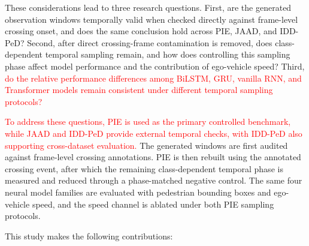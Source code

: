 \documentclass[mti,article,submit,moreauthors]{Definitions/mdpi}
\begin{document}
These considerations lead to three research questions. First, are the generated observation windows temporally valid when checked directly against frame-level crossing onset, and does the same conclusion hold across PIE, JAAD, and IDD-PeD? Second, after direct crossing-frame contamination is removed, does class-dependent temporal sampling remain, and how does controlling this sampling phase affect model performance and the contribution of ego-vehicle speed? Third, \textcolor{red}{do the relative performance differences among BiLSTM, GRU, vanilla RNN, and Transformer models remain consistent under different temporal sampling protocols?}

\textcolor{red}{To address these questions, PIE is used as the primary controlled benchmark, while JAAD and IDD-PeD provide external temporal checks, with IDD-PeD also supporting cross-dataset evaluation.} The generated windows are first audited against frame-level crossing annotations. PIE is then rebuilt using the annotated crossing event, after which the remaining class-dependent temporal phase is measured and reduced through a phase-matched negative control. The same four neural model families are evaluated with pedestrian bounding boxes and ego-vehicle speed, and the speed channel is ablated under both PIE sampling protocols.

This study makes the following contributions:
\end{document}
